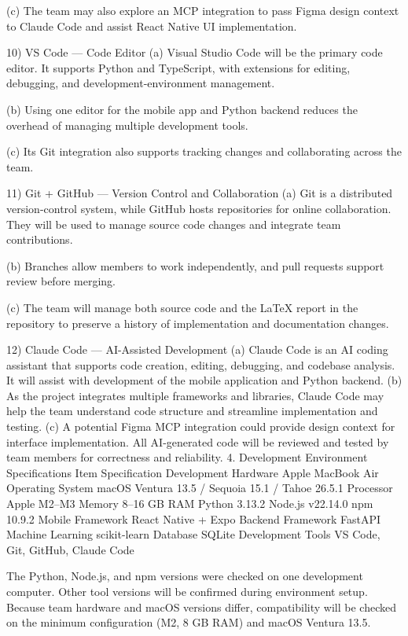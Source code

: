 (c) The team may also explore an MCP integration to pass Figma design context to Claude Code and assist React Native UI implementation.

10) VS Code — Code Editor
(a) Visual Studio Code will be the primary code editor. It supports Python and TypeScript, with extensions for editing, debugging, and development-environment management.

(b) Using one editor for the mobile app and Python backend reduces the overhead of managing multiple development tools.

(c) Its Git integration also supports tracking changes and collaborating across the team.

11) Git + GitHub — Version Control and Collaboration
(a) Git is a distributed version-control system, while GitHub hosts repositories for online collaboration. They will be used to manage source code changes and integrate team contributions.

(b) Branches allow members to work independently, and pull requests support review before merging.

(c) The team will manage both source code and the LaTeX report in the repository to preserve a history of implementation and documentation changes.

12) Claude Code — AI-Assisted Development
(a) Claude Code is an AI coding assistant that supports code creation, editing, debugging, and codebase analysis. It will assist with development of the mobile application and Python backend.
(b) As the project integrates multiple frameworks and libraries, Claude Code may help the team understand code structure and streamline implementation and testing.
(c) A potential Figma MCP integration could provide design context for interface implementation. All AI-generated code will be reviewed and tested by team members for correctness and reliability.
4. Development Environment Specifications
Item	Specification
Development Hardware	Apple MacBook Air
Operating System	macOS Ventura 13.5 / Sequoia 15.1 / Tahoe 26.5.1
Processor	Apple M2–M3
Memory	8–16 GB RAM
Python	3.13.2
Node.js	v22.14.0
npm	10.9.2
Mobile Framework	React Native + Expo
Backend Framework	FastAPI
Machine Learning	scikit-learn
Database	SQLite
Development Tools	VS Code, Git, GitHub, Claude Code

The Python, Node.js, and npm versions were checked on one development computer. Other tool versions will be confirmed during environment setup.
Because team hardware and macOS versions differ, compatibility will be checked on the minimum configuration (M2, 8 GB RAM) and macOS Ventura 13.5.

